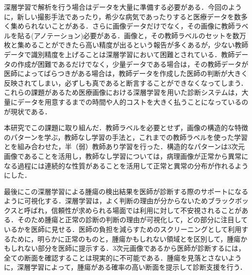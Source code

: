 深層学習で解析を行う場合はデータを大量に準備する必要がある．今回のように，新しい撮影手法であったり，希少な病気であったりすると医療データを数多く集められないことがある．さらに画像データだけでなく，その画像に教師ラベルを貼る(アノテーション)必要がある．画像と，その教師ラベルのセットを数万枚と集めることができたら高い精度が出るという報告が多くあるが，少ない教師データで識別精度を上げることは深層学習において困難とされている．教師データの作成が困難であるだけでなく，少量データである場合は，その教師データが医師によってばらつきがある場合は，教師データを作成した医師の判断が大きく反映されてしまい，必ずしも真であると断言することができなくなってしまう．これらの課題があるため医療画像における深層学習を用いた診断システムは，大量にデータを用意するまでの時間や人的コストを大きく払うことになっているのが現状である．

本研究でこの課題に取り組んだ．教師ラベルを必要とせず，画像の構造的な特徴のパターンを学ぶ，教師なし学習の手法と，これまでの教師ラベルを使った学習とを組み合わせた，半（弱）教師あり学習を行った．構造的なパターンは3次元画像であることを活用し，教師なし学習については，病理画像が正常から異常になる過程には連続的な性質があることを活用して正常と異常の分布が作れるようにした．


最後にこの深層学習による腫瘍の検出結果を医師が診断する際のサポートになるように可視化する．深層学習は，よく判断の理由が分からないためブラックボックスと呼ばれ，信頼性が求められる場面では利用に対して不安視されることがある．そのため腫瘍と正常の診断の判断の理由が可視化して，どの部分に注目しているかを医師に見せる．医師の負担を減らすためのスクリーニングとして利用するために，明らかに正常のものと，腫瘍かもしれない領域とを区別して，腫瘍かもしれない部分を医師に提示する．3次元画像であるから医師が診断するには，全ての断面を確認することは現実的に不可能である．腫瘍を見落とさないように，深層学習によって，腫瘍がある確率の高い断面を提示して診断支援を行う．